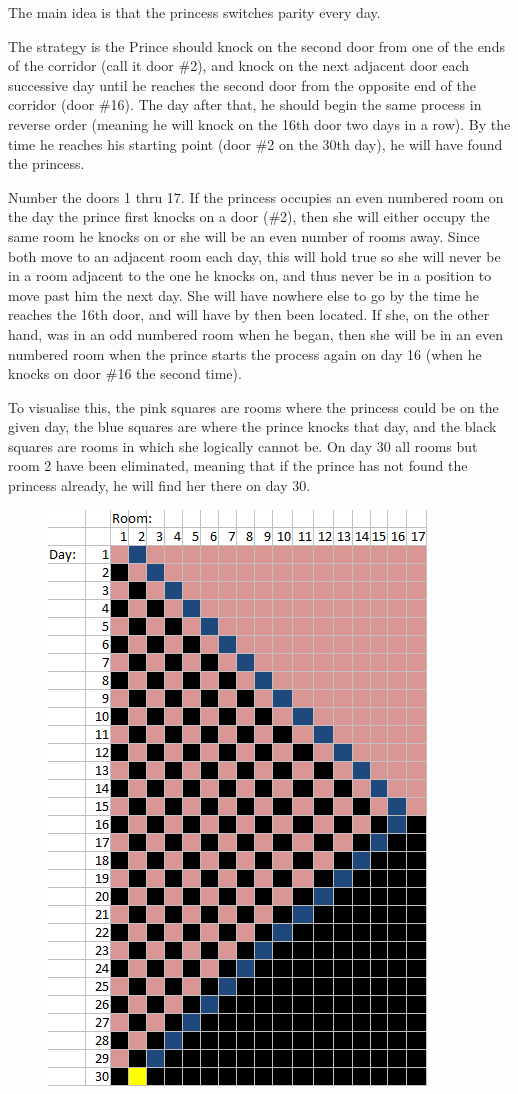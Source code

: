 \begin{solution}
The main idea is that the princess switches parity every day.

The strategy is the Prince should knock on the second door from one of the ends of the corridor (call it door \#2), and knock on the next adjacent door each successive day until he reaches the second door from the opposite end of the corridor (door \#16). The day after that, he should begin the same process in reverse order (meaning he will knock on the 16th door two days in a row). By the time he reaches his starting point (door \#2 on the 30th day), he will have found the princess.

Number the doors 1 thru 17.
If the princess occupies an even numbered room on the day the prince first knocks on a door (\#2), then she will either occupy the same room he knocks on or she will be an even number of rooms away. Since both move to an adjacent room each day, this will hold true so she will never be in a room adjacent to the one he knocks on, and thus never be in a position to move past him the next day. She will have nowhere else to go by the time he reaches the 16th door, and will have by then been located. If she, on the other hand, was in an odd numbered room when he began, then she will be in an even numbered room when the prince starts the process again on day 16 (when he knocks on door \#16 the second time).

To visualise this, the pink squares are rooms where the princess could be on the given day, the blue squares are where the prince knocks that day, and the black squares are rooms in which she logically cannot be. On day 30 all rooms but room 2 have been eliminated, meaning that if the prince has not found the princess already, he will find her there on day 30.

\begin{figure}[H]
    \centering
    \includegraphics[width=0.5\linewidth]{images/princess-problem.png}
\end{figure}
\end{solution}

